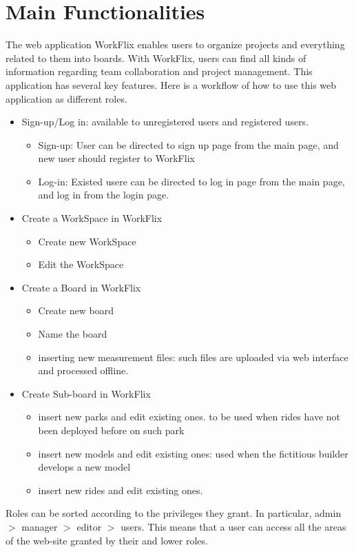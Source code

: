 \section{Main Functionalities}

The web application WorkFlix enables users to organize projects and everything related to them into boards.
With WorkFlix, users can find all kinds of information regarding team collaboration and project management.
This application has several key features. Here is a workflow of how to use this web application as different roles.

\begin{itemize}
    \item Sign-up/Log in: available to unregistered users and registered users. 
    \begin{itemize}
        \item Sign-up: User can be directed to sign up page from the main page, and new user should register to WorkFlix
        \item Log-in: Existed usere can be directed to log in page from the main page, and log in from the login page.
    \end{itemize}
    \item Create a WorkSpace in WorkFlix
    \begin{itemize}
        \item Create new WorkSpace
        \item Edit the WorkSpace
    \end{itemize}
    \item Create a Board in WorkFlix
    \begin{itemize}
        \item Create new board
        \item Name the board
        \item inserting new measurement files: such files are uploaded via web interface and processed offline.
    \end{itemize}
    \item Create Sub-board in WorkFlix
    \begin{itemize}
        \item insert new parks and edit existing ones. to be used when rides have not been deployed before on such park
        \item insert new models and edit existing ones: used when the fictitious builder develops a new model
        \item insert new rides and edit existing ones.
    \end{itemize}
\end{itemize}

Roles can be sorted according to the privileges they grant. In particular, admin $>$ manager $>$ editor $>$ users. This means that a user can access all the areas of the web-site granted by their and lower roles.\\




